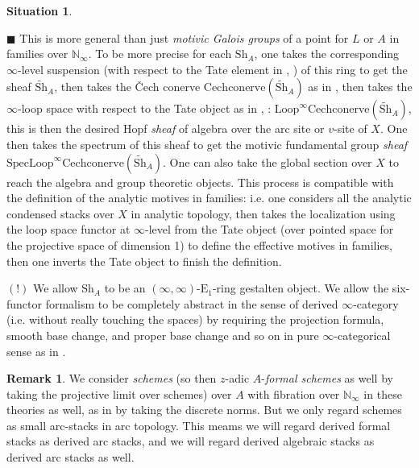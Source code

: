 \documentclass[12pt]{article}
\theoremstyle{definition}
\newtheorem{remark}{Remark}
\newtheorem{situation}{Situation}
\begin{document}
\begin{situation}
\begin{itemize}
\subitem $\blacksquare$ This is more general than just \textit{motivic Galois groups} of a point for $L$ or $A$ in families over $\mathbb{N}_\infty$. To be more precise for each $\mathrm{Sh}_A$, one takes the corresponding $\infty$-level suspension (with respect to the Tate element in \cite{3A}, \cite{3S}) of this ring to get the sheaf $\widetilde{\mathrm{Sh}}_A$, then takes the \v{C}ech conerve $\mathrm{Cechconerve}(\widetilde{\mathrm{Sh}}_A)$ as in \cite[4.9]{3A}, then takes the $\infty$-loop space with respect to the Tate object as in \cite{3A}, \cite{3S}: $\mathrm{Loop}^\infty\mathrm{Cechconerve}(\widetilde{\mathrm{Sh}}_A)$, this is then the desired Hopf \textit{sheaf} of algebra over the arc site or $v$-site of $X$. One then takes the spectrum of this sheaf to get the motivic fundamental group \textit{sheaf} $\mathrm{Spec}\mathrm{Loop}^\infty\mathrm{Cechconerve}(\widetilde{\mathrm{Sh}}_A)$. One can also take the global section over $X$ to reach the algebra and group theoretic objects. This process is compatible with the definition of the analytic  motives in families: i.e. one considers all the analytic condensed stacks over $X$ in analytic topology, then takes the localization using the loop space functor at $\infty$-level from the Tate object (over pointed space for the projective space of dimension 1) to define the effective motives in families, then one inverts the Tate object to finish the definition.
\end{itemize}
$(!)$ We allow $\mathrm{Sh}_A$ to be an $(\infty,\infty)$-$\mathrm{E}_1$-ring gestalten object. We allow the six-functor formalism to be completely abstract in the sense of derived $\infty$-category (i.e. without really touching the spaces) by requiring the projection formula, smooth base change, and proper base change and so on in pure $\infty$-categorical sense as in \cite{3CS1}.

\end{situation}

\begin{remark}
We consider \textit{schemes} (so then $z$-adic $A$-\textit{formal schemes} as well by taking the projective limit over schemes) over $A$ with fibration over $\mathbb{N}_\infty$ in these theories as well, as in \cite{3S} by taking the discrete norms. But we only regard schemes as small arc-stacks in arc topology. This meams we will regard derived formal stacks as derived arc stacks, and we will regard derived algebraic stacks as derived arc stacks as well.
\end{remark}
\end{document}
